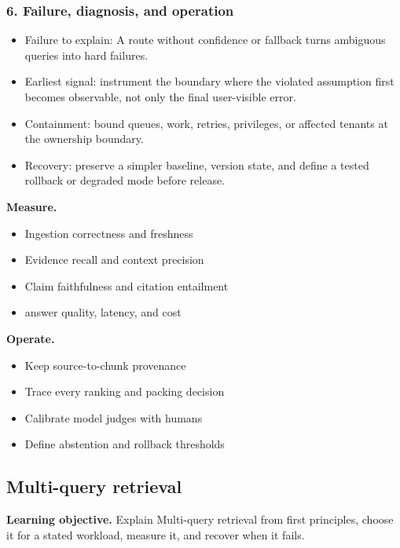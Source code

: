 \subsubsection*{6. Failure, diagnosis, and operation}
\begin{itemize}
\item Failure to explain: A route without confidence or fallback turns ambiguous queries into hard failures.
\item Earliest signal: instrument the boundary where the violated assumption first becomes observable, not only the final user-visible error.
\item Containment: bound queues, work, retries, privileges, or affected tenants at the ownership boundary.
\item Recovery: preserve a simpler baseline, version state, and define a tested rollback or degraded mode before release.
\end{itemize}
\textbf{Measure.}\begin{itemize}
\item Ingestion correctness and freshness
\item Evidence recall and context precision
\item Claim faithfulness and citation entailment
\item answer quality, latency, and cost
\end{itemize}
\textbf{Operate.}\begin{itemize}
\item Keep source-to-chunk provenance
\item Trace every ranking and packing decision
\item Calibrate model judges with humans
\item Define abstention and rollback thresholds
\end{itemize}
\subsection{Multi-query retrieval}
\textbf{Learning objective.} Explain Multi-query retrieval from first principles, choose it for a stated workload, measure it, and recover when it fails.
